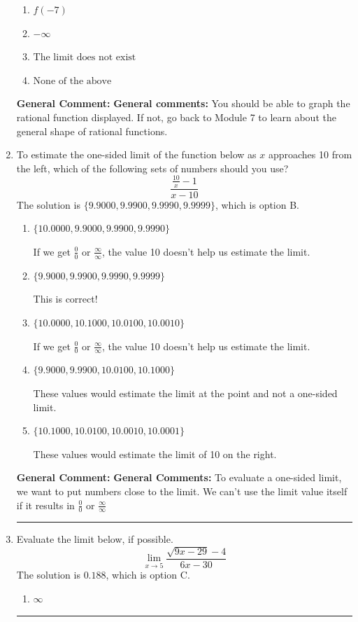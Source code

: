 \documentclass{extbook}[14pt]
\newcommand{\litem}[1]{\item #1

\rule{\textwidth}{0.4pt}}
\begin{document}
\begin{enumerate}
{\begin{enumerate}[label=\Alph*.]
\item \( f(-7) \)


\item \( -\infty \)


\item \( \text{The limit does not exist} \)


\item \( \text{None of the above} \)


\end{enumerate}

\textbf{General Comment:} \textbf{General comments:} You should be able to graph the rational function displayed. If not, go back to Module 7 to learn about the general shape of rational functions.
}
\litem{
To estimate the one-sided limit of the function below as $x$ approaches 10 from the left, which of the following sets of numbers should you use?
\[ \frac{\frac{10}{x} - 1}{x - 10} \]The solution is \( \{ 9.9000, 9.9900, 9.9990, 9.9999 \} \), which is option B.\begin{enumerate}[label=\Alph*.]
\item \( \{ 10.0000, 9.9000, 9.9900, 9.9990 \} \)

If we get $\frac{0}{0}$ or $\frac{\infty}{\infty}$, the value 10 doesn't help us estimate the limit.
\item \( \{ 9.9000, 9.9900, 9.9990, 9.9999 \} \)

This is correct!
\item \( \{ 10.0000, 10.1000, 10.0100, 10.0010 \} \)

If we get $\frac{0}{0}$ or $\frac{\infty}{\infty}$, the value 10 doesn't help us estimate the limit.
\item \( \{ 9.9000, 9.9900, 10.0100, 10.1000 \} \)

These values would estimate the limit at the point and not a one-sided limit.
\item \( \{ 10.1000, 10.0100, 10.0010, 10.0001 \} \)

These values would estimate the limit of 10 on the right.
\end{enumerate}

\textbf{General Comment:} \textbf{General Comments:} To evaluate a one-sided limit, we want to put numbers close to the limit. We can't use the limit value itself if it results in $\frac{0}{0}$ or $\frac{\infty}{\infty}$
}
\litem{
Evaluate the limit below, if possible.
\[ \lim_{x \rightarrow 5} \frac{\sqrt{9x - 29} - 4}{6x - 30} \]The solution is \( 0.188 \), which is option C.\begin{enumerate}[label=\Alph*.]
\item \( \infty \)


\end{enumerate}}
\end{enumerate}
\end{document}
